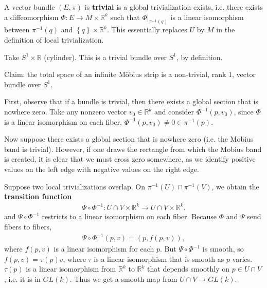 \documentclass{../mathnotes}
\begin{document}
\begin{defn}
    A vector bundle $(E,\pi)$ is \textbf{trivial} is a global trivialization exists, i.e. there exists a diffeomorphism $\Phi:E\to M\times \mathbb{R}^k$
    such that $\Phi|_{\pi^{-1}(q)}$ is a linear isomorphism between $\pi^{-1}(q)$ and $\left\{ q \right\}\times\mathbb{R}^k$. This essentially
    replaces $U$ by $M$ in the definition of local trivialization.
\end{defn}

\begin{exmp}
    Take $S^1\times \mathbb{R}$ (cylinder). This is a trivial bundle over $S^1$, by definition.
\end{exmp}

\begin{exmp}
    Claim: the total space of an infinite M\"{o}bius strip is a non-trivial, rank 1, vector bundle over $S^1$.

    First, observe that if a bundle is trivial, then there exists a global section that is nowhere zero. Take any nonzero vector $v_0\in\mathbb{R}^k$
    and consider $\Phi^{-1}(p,v_0)$, since $\Phi$ is a linear isomorphism on each fiber, $\Phi^{-1}(p,v_0)\neq0\in\pi^{-1}(p)$.

    Now suppose there exists a global section that is nowhere zero (i.e. the Mobius band is trivial). However, if one draws the rectangle
    from which the Mobius band is created, it is clear that we must cross zero somewhere, as we identify positive values on the left edge
    with negative values on the right edge.
\end{exmp}

\begin{defn}
    Suppose two local trivializations overlap. On $\pi^{-1}(U)\cap \pi^{-1}(V)$, we obtain the \textbf{transition function}
    \begin{align*}
        \Psi\circ\Phi^{-1}:U\cap V\times \mathbb{R}^k\to U\cap V\times \mathbb{R}^k.
    \end{align*}
    and $\Psi\circ\Phi^{-1}$ restricts to a linear isomorphism on each fiber. Because $\Phi$ and $\Psi$ send fibers to fibers,
    \begin{align*}
        \Psi\circ\Phi^{-1}(p,v)=(p, f(p, v)),
    \end{align*}
    where $f(p,v)$ is a linear isomorphism for each $p$. But $\Psi\circ\Phi^{-1}$ is smooth, so $f(p,v)=\tau(p)v$, where $\tau$ is a 
    linear isomorphism that is smooth as $p$ varies. $\tau(p)$ is a linear isomorphism from $\mathbb{R}^k$ to $\mathbb{R}^k$ that depends smoothly on $p\in U\cap V$,
    i.e. it is in $GL(k)$. Thus we get a smooth map from $U\cap V\to GL(k)$.
\end{defn}
\end{document}
